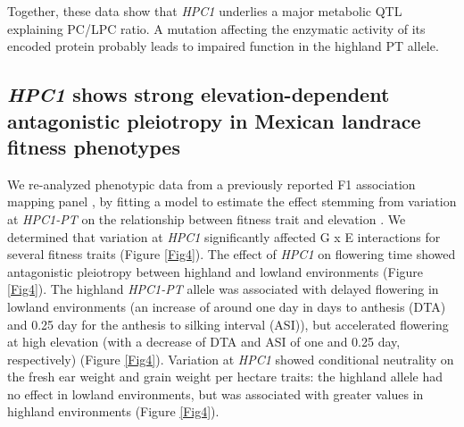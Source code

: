 \documentclass[9pt,twocolumn,twoside,lineno]{biorxiv}
\begin{document}
Together, these data show that \textit{HPC1} underlies a major metabolic QTL explaining PC/LPC ratio. A mutation affecting the enzymatic activity of its encoded protein probably leads to impaired function in the highland PT allele.  

\subsection{\textit{HPC1} shows strong elevation-dependent antagonistic pleiotropy in Mexican landrace fitness phenotypes} 
We re-analyzed phenotypic data from a previously reported F1 association mapping panel \cite{Romero_Navarro2017-cn} \cite{Gates2019-xu}, by fitting a model to estimate the effect stemming from variation at \textit{HPC1-PT} on the relationship between fitness trait and elevation \cite{Runcie2019-Gr}. 
We determined that variation at \textit{HPC1} significantly affected G x E interactions for several fitness traits (Figure \ref{Fig4}). 
The effect of \textit{HPC1} on flowering time showed antagonistic pleiotropy between highland and lowland environments (Figure \ref{Fig4}). 
The highland \textit{HPC1-PT} allele was associated with delayed flowering in lowland environments (an increase of around one day in days to anthesis (DTA)  and 0.25 day for the  anthesis to silking interval (ASI)), but accelerated flowering at high elevation (with a decrease of DTA and ASI of one and 0.25 day, respectively) (Figure \ref{Fig4}).
Variation at \textit{HPC1} showed conditional neutrality on the fresh ear weight and grain weight per hectare traits: the highland allele had no effect in lowland environments, but was associated with greater values in highland environments (Figure \ref{Fig4}).
\end{document}
